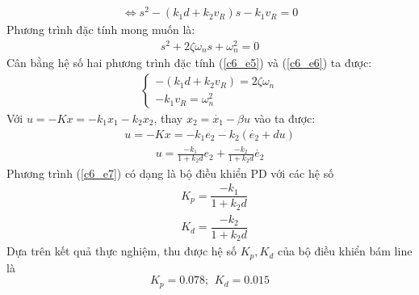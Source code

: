           \begin{align}
               \Leftrightarrow s^2 - (k_1d + k_2v_R)s - k_1v_R = 0
               \label{c6_e5}
          \end{align}
          \hspace*{0.6cm}Phương trình đặc tính mong muốn là:
          \begin{align}
               s^2 + 2\zeta\omega_ns + \omega_n^2 = 0 
               \label{c6_e6}
          \end{align}
          \hspace*{0.6cm}Cân bằng hệ số hai phương trình đặc tính (\ref{c6_e5}) và (\ref{c6_e6}) ta được:
          \begin{align*}
               \begin{cases}
               -(k_1d + k_2v_R) = 2\zeta\omega_n \\
               -k_1v_R = \omega_n^2
               \end{cases} 
          \end{align*}
          \hspace*{0.6cm}Với $u = -Kx = -k_1x_1 - k_2x_2$, thay $x_2 = \dot{x_1} - \beta u$ vào ta được:
          \begin{align*}
               u = -Kx = -k_1e_2 - k_2(\dot{e_2} + du)
          \end{align*}
          \begin{align}
               u = \frac{-k_1}{1 + k_2d}e_2 + \frac{-k_2}{1 + k_2d}\dot{e_2}
               \label{c6_e7}
          \end{align}
          \hspace*{0.6cm}Phương trình (\ref{c6_e7}) có dạng là bộ điều khiển PD với các hệ số
          \begin{align*}  
               &K_p = \dfrac{-k_1}{1+k_2 d}\\
               &K_d = \dfrac{-k_2}{1 + k_2 d}
          \end{align*}
          \hspace*{0.6cm}Dựa trên kết quả thực nghiệm, thu được hệ số $K_p, K_d$ của bộ điều khiển bám line là
          \begin{equation*}
               K_p = 0.078; \,\ K_d = 0.015
          \end{equation*}
